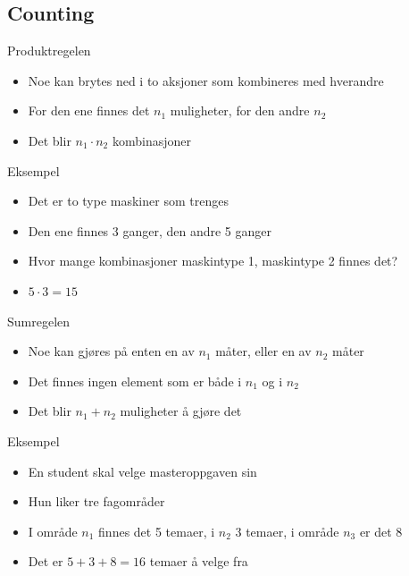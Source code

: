 \subsection{Counting}
\begin{frame}
    \begin{block}{Produktregelen}
        \begin{itemize}
        \item Noe kan brytes ned i to aksjoner som kombineres med hverandre
        \item For den ene finnes det $n_1$ muligheter, for den andre $n_2$
        \item Det blir $n_1\cdot n_2$ kombinasjoner
        \end{itemize}
    \end{block}
    \pause
    \begin{block}{Eksempel}
        \begin{itemize}
        \item Det er to type maskiner som trenges
        \item Den ene finnes 3 ganger, den andre 5 ganger
        \item Hvor mange kombinasjoner maskintype 1, maskintype 2 finnes det?
        \item $5\cdot 3=15$
        \end{itemize}
    \end{block}
\end{frame}

\begin{frame}
    \begin{block}{Sumregelen}
        \begin{itemize}
        \item Noe kan gjøres på enten en av $n_1$ måter, eller en av $n_2$ måter
        \item Det finnes ingen element som er både i $n_1$ og i $n_2$
        \item Det blir $n_1+n_2$ muligheter å gjøre det
        \end{itemize}
    \end{block}
    \pause
    \begin{block}{Eksempel}
        \begin{itemize}
        \item En student skal velge masteroppgaven sin
        \item Hun liker tre fagområder
        \item I område $n_1$ finnes det 5 temaer, i $n_2$ 3 temaer, i område $n_3$ er det 8
        \item Det er $5+3+8=16$ temaer å velge fra
        \end{itemize}
    \end{block}
\end{frame}

